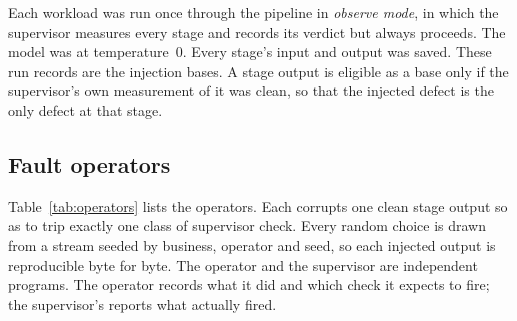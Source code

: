 Each workload was run once through the pipeline in \emph{observe mode}, in
which the supervisor measures every stage and records its verdict but always
proceeds. The model was \model{} at temperature~0. Every stage's input and
output was saved. These run records are the injection bases. A stage output is
eligible as a base only if the supervisor's own measurement of it was clean,
so that the injected defect is the only defect at that stage.

\subsection{Fault operators}
\label{sec:design-operators}

Table~\ref{tab:operators} lists the operators. Each corrupts one clean stage
output so as to trip exactly one class of supervisor check. Every random
choice is drawn from a stream seeded by business, operator and seed, so each
injected output is reproducible byte for byte. The operator and the supervisor
are independent programs. The operator records what it did and which check it
expects to fire; the supervisor's  reports what actually fired.

